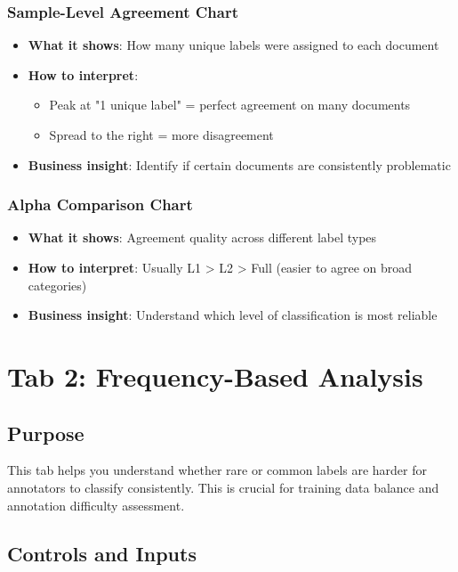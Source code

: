\documentclass[11pt]{article}
\begin{document}
\subsubsection{Sample-Level Agreement Chart}
\begin{itemize}
\item \textbf{What it shows}: How many unique labels were assigned to each document
\item \textbf{How to interpret}: 
\begin{itemize}
\item Peak at "1 unique label" = perfect agreement on many documents
\item Spread to the right = more disagreement
\end{itemize}
\item \textbf{Business insight}: Identify if certain documents are consistently problematic
\end{itemize}

\subsubsection{Alpha Comparison Chart}
\begin{itemize}
\item \textbf{What it shows}: Agreement quality across different label types
\item \textbf{How to interpret}: Usually L1 > L2 > Full (easier to agree on broad categories)
\item \textbf{Business insight}: Understand which level of classification is most reliable
\end{itemize}

\section{Tab 2: Frequency-Based Analysis}

\subsection{Purpose}
This tab helps you understand whether rare or common labels are harder for annotators to classify consistently. This is crucial for training data balance and annotation difficulty assessment.

\subsection{Controls and Inputs}
\end{document}
